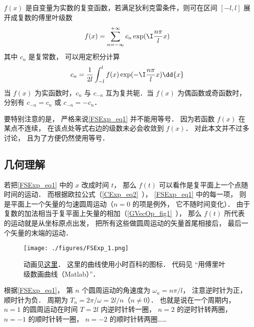 
$f(x)$ 是自变量为实数的复变函数，若满足狄利克雷条件，则可在区间 $[- l,l]$ 展开成复数的傅里叶级数
\begin{equation}\label{FSExp_eq1}
f(x) = \sum_{n =  - \infty }^{ + \infty } c_n \exp ( \I\frac{n\pi }{l}x )
\end{equation}
其中 $c_n$ 是复常数， 可以用定积分计算
\begin{equation}\label{FSExp_eq2}
c_n = \frac{1}{2l} \int_{ - l}^l  f(x)\exp( -\I\frac{n\pi }{l}x ) \dd{x} 
\end{equation}
当 $f(x)$ 为实函数时，$c_n$ 与 $c_{-n}$ 互为复共轭．当 $f(x)$ 为偶函数或奇函数时，分别有 $c_{-n} = c_n$ 或 $c_{-n} = -c_n$．

要特别注意的是， 严格来说\autoref{FSExp_eq1} 并不能用等号． 因为若函数 $f(x)$ 在某点不连续， 在该点处等式右边的级数未必会收敛到 $f(x)$． 对此本文并不过多讨论， 且为了方便仍然使用等号．

\subsection{几何理解}
若把\autoref{FSExp_eq1} 中的 $x$ 改成时间 $t$， 那么 $f(t)$ 可以看作是复平面上一个点随时间的运动． 而根据欧拉公式（\autoref{CExp_eq2}~）， \autoref{FSExp_eq1} 中的每一项， 则是平面上一个矢量的匀速圆周运动（$n=0$ 的项是例外， 它不随时间变化）． 由于复数的加法相当于复平面上矢量的相加（\autoref{GVecOp_fig1}~）， 那么 $f(t)$ 所代表的运动就是从坐标原点出发， 把所有这些做圆周运动的矢量首尾相接后， 最后一个矢量的末端的运动．

\begin{figure}[ht]
\centering
\texttt{[image: ./figures/FSExp\_1.png]}
\caption{动画见\href{https://wuli.wiki/apps/FFTplt.html}{这里}． 这里的曲线使用小时百科的图标． 代码见 “用傅里叶级数画曲线（Matlab）”．} \label{FSExp_fig1}
\end{figure}

根据\autoref{FSExp_eq1}， 第 $n$ 个圆周运动的角速度为 $\omega_n = n\pi/l$， 注意逆时针为正， 顺时针为负． 周期为 $T_n = 2\pi/\omega = 2l/n$（$n\ne 0$）． 也就是说在一个周期内， $n=1$ 的圆周运动在时间 $T = 2l$ 内逆时针转一圈， $n=2$ 的逆时针转两圈， $n=-1$ 的顺时针转一圈， $n=-2$ 的顺时针转两圈……

